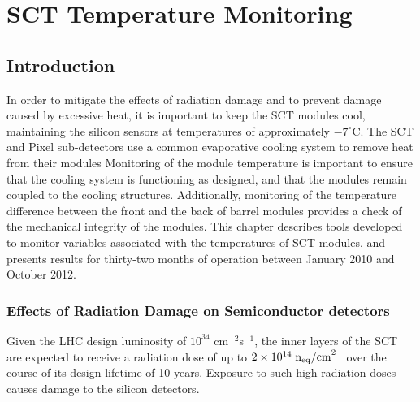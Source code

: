 \graphicspath{{Chapters/SCT/Figures/}}

\chapter{SCT Temperature Monitoring}
\label{chap:SCT}

\section{Introduction}

In order to mitigate the effects of radiation damage and to prevent damage
caused by excessive heat, it is important to keep
the SCT modules cool, maintaining the silicon sensors at temperatures of approximately $-7^{\circ}$C. The
SCT and Pixel sub-detectors use a common evaporative cooling system to remove
heat from their modules
Monitoring of the module
temperature is important to ensure that the cooling system is functioning as
designed, and that the modules remain coupled to the cooling structures.
Additionally, monitoring of the temperature difference between the front and the
back of barrel modules provides a check of the mechanical integrity of the
modules. This
chapter describes tools developed to monitor variables associated with the
temperatures of SCT modules, and presents results for thirty-two months of
operation between January 2010 and October 2012.



\subsection{Effects of Radiation Damage on Semiconductor detectors}
Given the LHC design luminosity of $10^{34}$ cm$^{-2}$s$^{-1}$, the
inner layers of the 
SCT are expected to receive a radiation dose of up to
$2\times10^{14}\;\rm{n_{eq}/cm}^2$~\cite{Ahmad200798} over the course of its design
lifetime of 10 years.
Exposure to such high radiation doses causes damage to the silicon detectors. 

